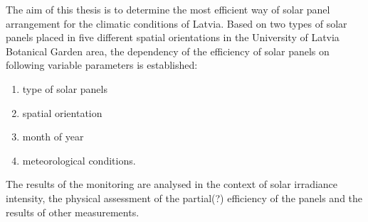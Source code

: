 The aim of this thesis is to determine the most efficient way of solar panel arrangement for the climatic conditions of Latvia.
Based on two types of solar panels placed in five different spatial orientations in the University of Latvia Botanical Garden area, the dependency of the efficiency of solar panels on following variable parameters is established:
\begin{enumerate}
\item type of solar panels
\item spatial orientation
\item month of year
\item meteorological conditions.
\end{enumerate}

The results of the monitoring are analysed in the context of solar irradiance intensity, the physical assessment of the partial(?) efficiency of the panels and the results of other measurements.

